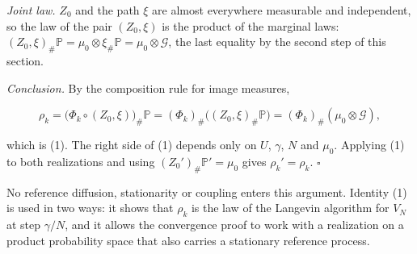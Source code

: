 \documentclass[11pt,a4paper]{report}
\begin{document}
\emph{Joint law.} \(Z_0\) and the path \(\xi\) are almost everywhere measurable and independent, so the law of the pair \((Z_0,\xi)\) is the product of the marginal laws: \((Z_0,\xi)_\#\mathbb P=\mu_0\otimes\xi_\#\mathbb P=\mu_0\otimes\mathcal G\), the last equality by the second step of this section.




\emph{Conclusion.} By the composition rule for image measures,


\[\rho_k=\bigl(\Phi_k\circ(Z_0,\xi)\bigr)_\#\mathbb P=(\Phi_k)_\#\bigl((Z_0,\xi)_\#\mathbb P\bigr)=(\Phi_k)_\#(\mu_0\otimes\mathcal G),\]


which is (1). The right side of (1) depends only on \(U\), \(\gamma\), \(N\) and \(\mu_0\). Applying (1) to both realizations and using \((Z_0')_\#\mathbb P'=\mu_0\) gives \(\rho_k'=\rho_k\). \(\square\)




No reference diffusion, stationarity or coupling enters this argument. Identity (1) is used in two ways: it shows that \(\rho_k\) is the law of the Langevin algorithm for \(V_N\) at step \(\gamma/N\), and it allows the convergence proof to work with a realization on a product probability space that also carries a stationary reference process.
\end{document}
